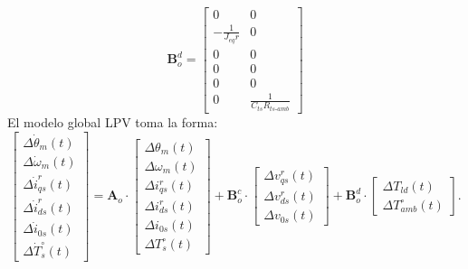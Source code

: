 \documentclass[12pt, a4paper,journal, onecolumn, compsoc]{IEEEtran}
\begin{document}
\begin{equation*}
\bm B_o^d = \begin{bmatrix}
0 & 0 \\
-\frac{1}{J_{eq} r} & 0 \\
0 & 0 \\
0 & 0 \\
0 & 0 \\
0 & \frac{1}{C_{ts} R_{ts\text{-}amb}}
\end{bmatrix} 
\end{equation*}
El modelo global LPV toma la forma:
\begin{equation}
\begin{bmatrix}
\Delta \dot{\theta}_m(t) \\
\Delta \dot{\omega}_m(t) \\
\Delta \dot{i}_{qs}^r(t) \\
\Delta \dot{i}_{ds}^r(t) \\
\Delta \dot{i}_{0s}(t) \\
\Delta \dot{T}_s^\circ(t)
\end{bmatrix} = \bm A_o \cdot
\begin{bmatrix}
\Delta \theta_m(t) \\
\Delta \omega_m(t) \\
\Delta i_{qs}^r(t) \\
\Delta i_{ds}^r(t) \\
\Delta i_{0s}(t) \\
\Delta T_s^\circ(t)
\end{bmatrix} + \bm B_o^c \cdot
\begin{bmatrix}
\Delta v_{qs}^r(t) \\
\Delta v_{ds}^r(t) \\
\Delta v_{0s}(t)
\end{bmatrix} + \bm B_o^d \cdot
\begin{bmatrix}
\Delta T_{ld}(t) \\
\Delta T_{amb}^\circ(t)
\end{bmatrix}.
\end{equation}
\end{document}
